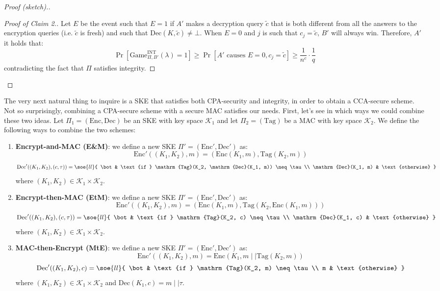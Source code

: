 \documentclass[a4paper, 12pt]{report}
\begin{document}
\begin{proof}[Proof (sketch).]
\begin{proof}[Proof of Claim 2.]
            Let $E$ be the event such that $E = 1$ if $A'$ makes a decryption query $\widetilde c$ that is both different from all the answers to the encryption queries (i.e. $\widetilde c$ is fresh) and such that $\mathrm{Dec}(K, \widetilde c) \neq \bot$. When $E = 0$ and $j$ is such that $c_j = \widetilde c$, $B'$ will always win. Therefore, $A'$ it holds that:
            \[\Pr[\mathrm{Game}_{\Pi, B'}^{\text{INT}}(\lambda) = 1] \geq \Pr[\text{$A'$ causes $E = 0$}, c_j = \widetilde c] \geq \frac{1}{n^c} \cdot \frac{1}{q} \]
            contradicting the fact that $\Pi$ satisfies integrity.
        \end{proof}
    \end{proof}
        

    The very next natural thing to inquire is a SKE that satisfies both CPA-security and integrity, in order to obtain a CCA-secure scheme. Not so surprisingly, combining a CPA-secure scheme with a secure MAC satisfies our needs. First, let's see in which ways we could combine these two ideas. Let $\Pi_1 = (\mathrm{Enc}, \mathrm{Dec})$ be an SKE with key space $\mathcal{K}_1$ and let $\Pi_2 = (\mathrm{Tag})$ be a MAC with key space $\mathcal{K}_2$. We define the following ways to combine the two schemes:
    \begin{enumerate}
        \item \textbf{Encrypt-and-MAC (E\&M)}: we define a new SKE $\Pi' = (\mathrm{Enc}', \mathrm{Dec}')$ as:
        \[\mathrm{Enc}'((K_1,K_2), m) = (\mathrm{Enc}(K_1, m), \mathrm{Tag}(K_2,m))\]
        \[\mathrm{Dec}'((K_1, K_2), (c, \tau)) = \soe{ll}{
            \bot & \text{if } \mathrm{Tag}(K_2, \mathrm{Dec}(K_1, m)) \neq \tau \\
            \mathrm{Dec}(K_1, m) & \text{otherwise}
        }\]
        where $(K_1, K_2) \in \mathcal{K}_1 \times \mathcal{K}_2$.

        \item \textbf{Encrypt-then-MAC (EtM)}: we define a new SKE $\Pi' = (\mathrm{Enc}', \mathrm{Dec}')$ as:
        \[\mathrm{Enc}'((K_1,K_2), m) = (\mathrm{Enc}(K_1, m), \mathrm{Tag}(K_2,\mathrm{Enc}(K_1, m)))\]
        \[\mathrm{Dec}'((K_1, K_2), (c, \tau)) = \soe{ll}{
            \bot & \text{if } \mathrm{Tag}(K_2, c) \neq \tau \\
            \mathrm{Dec}(K_1, c) & \text{otherwise}
        }\]
        where $(K_1, K_2) \in \mathcal{K}_1 \times \mathcal{K}_2$.

        \item \textbf{MAC-then-Encrypt (MtE)}: we define a new SKE $\Pi' = (\mathrm{Enc}', \mathrm{Dec}')$ as:
        \[\mathrm{Enc}'((K_1,K_2), m) = \mathrm{Enc}(K_1, m \mid\mid \mathrm{Tag}(K_2,m))\]
        \[\mathrm{Dec}'((K_1, K_2), c) = \soe{ll}{
            \bot & \text{if } \mathrm{Tag}(K_2, m) \neq \tau \\
            m & \text{otherwise}
        }\]
        where $(K_1, K_2) \in \mathcal{K}_1 \times \mathcal{K}_2$ and $\mathrm{Dec}(K_1, c) = m \mid\mid \tau$.
    \end{enumerate}  
\end{document}
